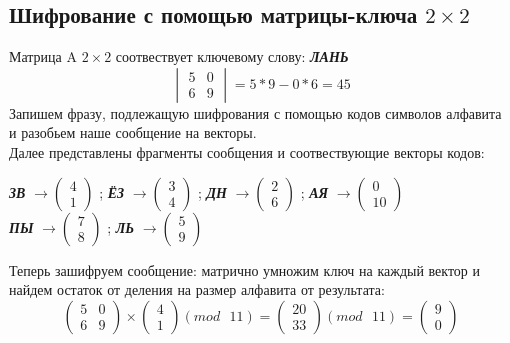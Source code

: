 \documentclass[a5paper, 10pt]{article}
\theoremstyle{definition}
\theoremstyle{plain}
\theoremstyle{remark}
\begin{document}
\subsection{Шифрование с помощью матрицы-ключа $2 \times 2$}
Матрица A $2 \times 2$ соотвествует ключевому слову: \textbf{\textit{ЛАНЬ}}
\begin{equation}
\begin{vmatrix}
 5 & 0\\
 6 & 9
\end{vmatrix}
= 5 * 9 - 0 * 6 = 45
\end{equation}
Запишем фразу, подлежащую шифрования с помощью кодов символов алфавита и разобьем наше сообщение на векторы. \\
Далее представлены фрагменты сообщения и соотвествующие векторы кодов:
\begin{center}
\textbf{\textit{ЗВ}} $\to \begin{pmatrix}
 4\\
1
\end{pmatrix}$ ;
\textbf{\textit{ЁЗ}}  $\to \begin{pmatrix}
 3\\
4
\end{pmatrix}$ ;
\textbf{\textit{ДН}}  $\to \begin{pmatrix}
 2\\
6
\end{pmatrix}$ ;
\textbf{\textit{АЯ}}  $\to \begin{pmatrix}
 0\\
10
\end{pmatrix}$ \\
\textbf{\textit{ПЫ}}  $\to \begin{pmatrix}
 7\\
8
\end{pmatrix}$ ;
\textbf{\textit{ЛЬ}}  $\to \begin{pmatrix}
 5\\
9
\end{pmatrix}$ \\
\end{center}

Теперь зашифруем сообщение: матрично умножим ключ на каждый вектор и найдем остаток от деления на размер алфавита от результата:
\begin{equation}
\begin{pmatrix}
 5 & 0\\
 6 & 9
\end{pmatrix}
 \times
\begin{pmatrix}
 4\\
1
\end{pmatrix}
(mod \text{ }11)
= 
\begin{pmatrix}
 20\\
33
\end{pmatrix}
(mod \text{ }11)
= \begin{pmatrix}
 9\\
0
\end{pmatrix}
\end{equation}
\end{document}
